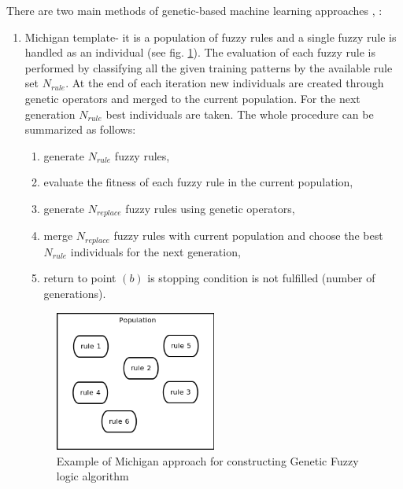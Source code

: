 There are two main methods of genetic-based machine learning approaches
\cite{bib30}, \cite{bib31}:
\begin{enumerate}
    \item Michigan template- it is a population of fuzzy rules and a single
        fuzzy rule is handled as an individual (see fig. \ref{fig:michigan}). 
        The evaluation of each fuzzy rule is performed by classifying all the 
        given training patterns by the available rule set $N_{rule}$. At the 
        end of each iteration new individuals are created through genetic operators 
        and merged to the current population. For the next generation $N_{rule}$ 
        best individuals are taken. The whole procedure can be summarized as follows:
        \begin{enumerate}
            \item generate $N_{rule}$ fuzzy rules,
            \item evaluate the fitness of each fuzzy rule in the current
                population,
            \item generate $N_{replace}$ fuzzy rules using genetic operators,
            \item merge $N_{replac e}$ fuzzy rules with current population and
               choose the best $N_{rule}$ individuals for the next generation,
             \item return to point  $(b)$ is stopping condition is not fulfilled
                (number of generations).
        \end{enumerate}
        \begin{figure}[H]
            \begin{center}
                \includegraphics[width=0.5\textwidth, height=0.4\textwidth]{fig/michigan.png}
            \end{center}
            \caption{Example of Michigan approach for constructing Genetic Fuzzy logic algorithm}
            \label{fig:michigan}
        \end{figure}

\end{enumerate}
